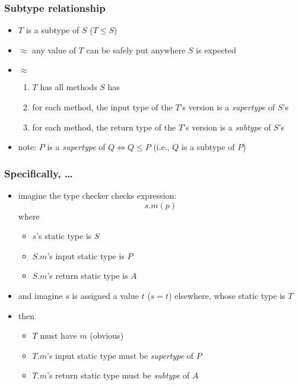 \documentclass[12pt,dvipdfmx]{beamer}
\newcommand{\ao}[1]{{\color{blue}#1}}
\begin{document}
\begin{frame}
  \frametitle{Subtype relationship}
  \begin{itemize}
  \item $T$ is a subtype of $S$ ($T \leq S$)
  \item $\approx$
    any value of $T$ can be safely put anywhere $S$ is expected
  \item $\approx$
    \begin{enumerate}
    \item $T$ has all methods $S$ has 
    \item for each method,
      the input type of the $T$'s version is a \ao{\it supertype} of $S$'s
    \item for each method,
      the return type of the $T$'s version is a \ao{\it subtype} of $S$'s
    \end{enumerate}
  \item note: $P$ is a \ao{\it supertype} of $Q \iff Q \leq P$
    (i.e., $Q$ is a subtype of $P$)
  \end{itemize}
\end{frame}

\begin{frame}
  \frametitle{Specifically, \ldots}
  \begin{itemize}
  \item imagine the type checker checks expression:
    \[ s.m(p) \]
    where
    \begin{itemize}
    \item $s$'s static type is $S$
    \item $S.m$'s input static type is $P$
    \item $S.m$'s return static type is $A$
    \end{itemize}
  \item and imagine $s$ is assigned a value $t$ ($s = t$) elsewhere,
    whose static type is $T$ 
  \item then
    \begin{itemize}
    \item $T$ must have $m$ (obvious)
    \item $T.m$'s input static type must be \ao{\it supertype} of $P$
    \item $T.m$'s return static type must be \ao{\it subtype} of $A$
    \end{itemize}
  \end{itemize}
\end{frame}
\end{document}
